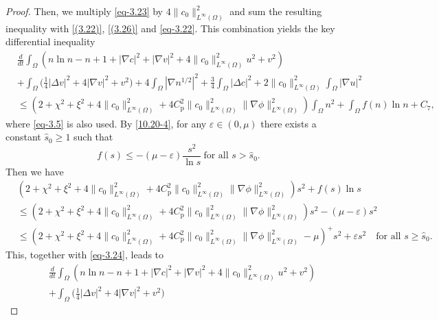 \documentclass[10pt,a4paper]{amsart}
\numberwithin{equation}{section}
\begin{document}
\begin{proof}
Then, we multiply \eqref{eq-3.23} by $4\|c_0\|^2_{L^\infty(\Omega)}$ and sum 
the resulting inequality with \eqref{(3.22)}, \eqref{(3.26)} and \eqref{eq-3.22}. 
This combination yields the key differential inequality
\begin{equation}\label{eq-3.24}
\begin{aligned}
&\frac{d}{dt} \int_{\Omega} \left( n \ln n - n + 1 + |\nabla c|^2 
+ |\nabla v|^2 + 4\|c_0\|_{L^\infty(\Omega)}^2 u^2 +  v^2\right) \\
& +\int_{\Omega}\Big(\frac{1}{4} |\Delta v|^2+4|\nabla v|^2+ v^2\Big) 
+ 4 \int_{\Omega}| \nabla n^{1/2}|^2
+ \frac{3}{4} \int_{\Omega} |\Delta c|^2  
+2 \|c_0\|_{L^\infty(\Omega)}^2 \int_{\Omega} |\nabla u|^2 \\
&\leq \left( 2 + \chi^2 + \xi^2+4\|c_0\|_{L^\infty(\Omega)}^2 
 + 4 C_{\mathrm{p}}^2\|c_0\|_{L^\infty(\Omega)}^2 
 \|\nabla \phi\|_{L^\infty(\Omega)}^2\right) 
 \int_{\Omega} n^2 + \int_{\Omega}  f(n)\ln n + C_7,
\end{aligned}
\end{equation}
where \eqref{eq-3.5} is also used.
By  \eqref{10.20-4}, for any $\varepsilon \in (0, \mu)$ there exists a constant 
$\hat{s}_0\geq 1$ such that
\begin{equation} \label{eq-3.25}
    f(s) \leq -(\mu - \varepsilon) \frac{s^2}{\ln s} \ \text{for all } s > \hat{s}_0.
\end{equation}
Then we have
\begin{align*}
&(2 + \chi^2 + \xi^2+  4\|c_0\|_{L^\infty(\Omega)}^2
 +4 C_{\mathrm{p}}^2\|c_0\|_{L^\infty(\Omega)}^2 \|\nabla \phi\|_{L^\infty(\Omega)}^2 ) s^2 +  f(s) \ln s \\
&\leq ( 2 + \chi^2 + \xi^2+ 4\|c_0\|_{L^\infty(\Omega)}^2
 +4 C_{\mathrm{p}}^2\|c_0\|_{L^\infty(\Omega)}^2 \|\nabla \phi\|_{L^\infty(\Omega)}^2) s^2 - (\mu - \varepsilon)s^2\\
&\leq \left( 2 + \chi^2 + \xi^2 + 4\|c_0\|_{L^\infty(\Omega)}^2
 + 4 C_{\mathrm{p}}^2\|c_0\|_{L^\infty(\Omega)}^2 \|\nabla \phi\|_{L^\infty(\Omega)}^2 - \mu\right)^+ s^2 + \varepsilon s^2 \quad
\text{for all } s \geq \hat{s}_0.
\end{align*}
This, together with \eqref{eq-3.24}, leads to
\begin{equation}\label{eq-3.26}
\begin{aligned}
&\frac{d}{dt} \int_{\Omega} \left( n \ln n - n + 1 + |\nabla c|^2 + |\nabla v|^2 + 4\|c_0\|_{L^\infty(\Omega)}^2 u^2 + v^2 \right)\\
& +\int_{\Omega}\Big(\frac{1}{4} |\Delta v|^2+4|\nabla v|^2+ v^2\Big)

\end{aligned}
\end{equation}
\end{proof}
\end{document}
